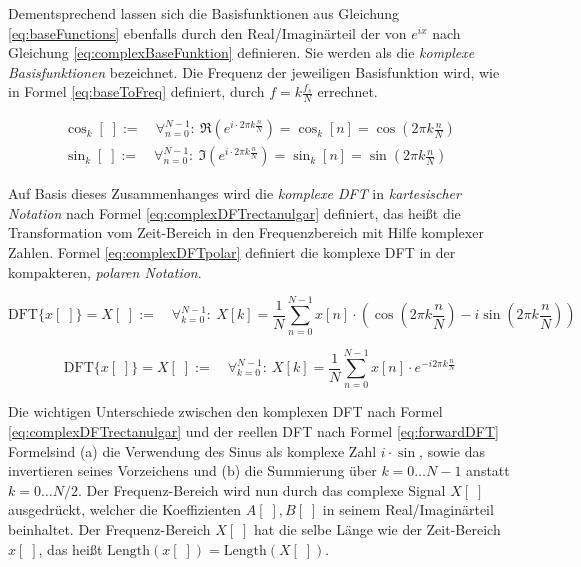 Dementsprechend lassen sich die Basisfunktionen aus Gleichung \ref{eq:baseFunctions} ebenfalls durch den Real/Imaginärteil der von $e^{ix}$ nach Gleichung \ref{eq:complexBaseFunktion} definieren. Sie werden als die \emph{komplexe Basisfunktionen} bezeichnet. Die Frequenz der jeweiligen Basisfunktion wird, wie in Formel \ref{eq:baseToFreq} definiert, durch  $f = k\frac{f_s}{N}$ errechnet. 

\begin{equation}
\begin{gathered}
\cos_k[\;] := \quad \mathop{\forall}_{n = 0}^{N-1} :\  \Re(e^{i\cdot 2\pi k \frac{n}{N}}) = \cos_k[n] = \cos(2\pi k \frac{n}{N}) \\
\sin_k[\;] := \quad \mathop{\forall}_{n = 0}^{N-1} :\ \Im(e^{i\cdot 2\pi k \frac{n}{N}}) = \sin_k[n] = \sin(2\pi k \frac{n}{N})
\end{gathered}
\label{eq:complexBaseFunktion}
\end{equation}

Auf Basis dieses Zusammenhanges wird die \emph{komplexe DFT} in \emph{kartesischer Notation} nach Formel \ref{eq:complexDFTrectanulgar} definiert, das heißt die Transformation vom Zeit-Bereich in den Frequenzbereich mit Hilfe komplexer Zahlen. Formel \ref{eq:complexDFTpolar} definiert die komplexe DFT in der kompakteren, \emph{polaren Notation}. \cite[S. 570]{dspGuide}

\begin{equation}
\label{eq:complexDFTrectanulgar}
\text{DFT}\{x[\;]\} = X[\;]  := \quad \mathop{\forall}_{k = 0}^{N-1} :\ X[k] = \frac{1}{N} \sum_{n = 0}^{N-1}  x[n] \cdot (\cos (2\pi k \frac{n}{N}) -i \sin (2 \pi k \frac{n}{N}) )
\end{equation}

\begin{equation}
\label{eq:complexDFTpolar}
\text{DFT}\{x[\;]\} = X[\;]  := \quad \mathop{\forall}_{k = 0}^{N-1} :\ X[k] =  \frac{1}{N} \sum_{n = 0}^{N-1}  x[n] \cdot e^{-i 2\pi k \frac{n}{N}}
\end{equation}

Die wichtigen Unterschiede zwischen den komplexen DFT nach Formel  \ref{eq:complexDFTrectanulgar} und der reellen DFT nach Formel \ref{eq:forwardDFT} Formelsind (a) die Verwendung des Sinus als komplexe Zahl $i \cdot \sin$, sowie das invertieren seines Vorzeichens und (b) die Summierung über $k = 0\ldots N-1 $ anstatt $k = 0 \ldots N/2$. Der Frequenz-Bereich wird nun durch das complexe Signal $X[\;]$ ausgedrückt, welcher die Koeffizienten $A[\;],B[\;]$ in seinem Real/Imaginärteil beinhaltet. Der Frequenz-Bereich $X[\;]$ hat die selbe Länge wie der Zeit-Bereich $x[\;]$, das heißt $\text{Length}(x[\;]) = \text{Length}(X[\;])$. \cite[S. 571]{dspGuide}

